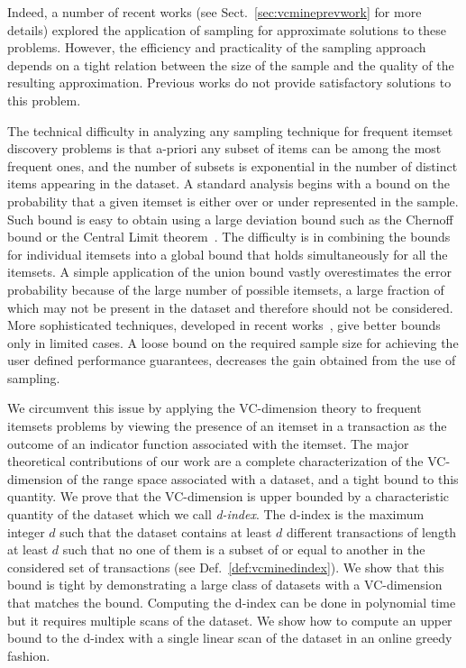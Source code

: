 Indeed, a number of recent works (see
Sect.~\ref{sec:vcmineprevwork} for more details)
explored the application of sampling for approximate solutions to these
problems. However, the efficiency and practicality of the sampling approach
depends on a tight relation between the size of the sample and the quality of
the resulting approximation. Previous works do not provide satisfactory
solutions to this problem.

The technical difficulty in analyzing any sampling technique for frequent
itemset discovery problems is that a-priori any subset of items can be among
the most frequent ones, and the number of subsets is exponential in the number
of distinct items appearing in the dataset. A standard analysis begins with a bound on
the probability that a given itemset is either over or under represented in the
sample. Such bound is easy to obtain using a large deviation bound such as the
Chernoff bound or the Central Limit theorem~\citep{MitzenmacherU05}. The
difficulty is in combining the bounds for individual itemsets
into a global bound that holds simultaneously for all the itemsets. A simple
application of the union bound vastly overestimates the error probability
because of the large number of possible itemsets, a large fraction of which may
not be present in the dataset and therefore should not be considered. More
sophisticated techniques, developed in recent
works~\citep{ChakaravarthyPS09,PietracaprinaRUV10,ChuangCY05}, give better
bounds only in limited cases. A loose bound 
 on the required sample size for achieving the user defined
 performance guarantees, decreases the gain obtained from the use of sampling. 

We circumvent this issue by applying the VC-dimension theory to
frequent itemsets problems by viewing the presence of an itemset in a
transaction as the outcome of an indicator function associated with the itemset.
The major theoretical contributions of our work are a complete characterization
of the VC-dimension of the range space associated with a dataset, and a tight
bound to this quantity. We prove that the VC-dimension is upper bounded by a
characteristic quantity of the dataset
which we call \emph{d-index}. The d-index is the maximum integer $d$ such that the
dataset contains at least $d$ different transactions of length at least $d$ such
that no one of them is a subset of or equal to another in the considered set
of transactions (see Def.~\ref{def:vcminedindex}). We show that this bound is tight
by
demonstrating a large class of datasets with a VC-dimension that matches the
bound. Computing the d-index can be done in polynomial time but it requires
multiple scans of the dataset. We show how to compute an upper bound to the
d-index with a single linear scan of the dataset in an online greedy fashion.

